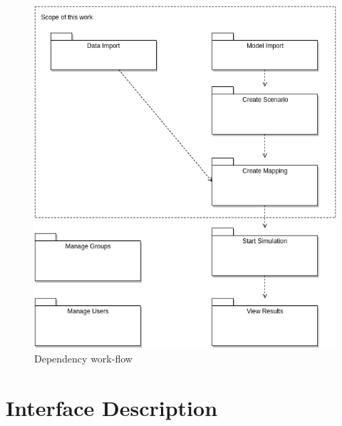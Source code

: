 \begin{figure}[H]
	\centering\includegraphics[width=.7\textwidth]{res/Dependency-workflow}
	\caption{Dependency work-flow}
	\label{fig:dependency-workflow}
\end{figure}



\section{Interface Description}
